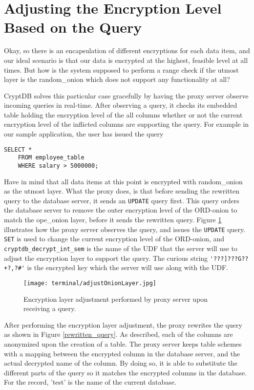 \section{Adjusting the Encryption Level Based on the Query}
\label{adjust_enc_level}

Okay, so there is an encapsulation of different encryptions for each data item, and our ideal scenario is that our data is encrypted at the highest, feasible level at all times.  But how is the system supposed to perform a range check if the utmost layer is the \gls{random_onion} which does not support any functionality at all?

CryptDB solves this particular case gracefully by having the proxy server observe incoming queries in real-time. After observing a query, it checks its embedded table holding the encryption level of the all columns whether or not the current encryption level of the inflicted columns are supporting the query. For example in our sample application, the user has issued the query 
\begin{verbatim}
SELECT *
	FROM employee_table
	WHERE salary > 5000000;
\end{verbatim}

Have in mind that all data items at this point is encrypted with \gls{random_onion} as the utmost layer. What the proxy does, is that before sending the rewritten query to the database server, it sends an \verb!UPDATE! query first. This query orders the database server to remove the outer encryption level of the ORD-onion to match the \gls{ope_onion} layer, before it sends the rewritten query. Figure \ref{ope_layer_adjustment} illustrates how the proxy server observes the query, and issues the \verb!UPDATE! query. \verb!SET! is used to change the current encryption level of the ORD-onion, and \verb!cryptdb_decrypt_int_sem! is the name of the UDF that the server will use to adjust the encryption layer to  support the query. The curious string \verb!'???]???G??+?,?#'! is the encrypted key which the server will use along with the UDF.

\begin{figure}[h]
	\texttt{[image: terminal/adjustOnionLayer.jpg]}
	\caption{Encryption layer adjustment performed by proxy server upon receiving a query.}
	\label{ope_layer_adjustment}
\end{figure}

After performing the encryption layer adjustment, the proxy rewrites the query as shown in Figure \ref{rewritten_query}. As described, each of the columns are anonymized upon the creation of a table. The proxy server keeps table schemes with a mapping between the encrypted column in the database server, and the actual decrypted name of the column. By doing so, it is able to substitute the different parts of the query so it matches the encrypted columns in the database. For the record, 'test' is the name of the current database.  

